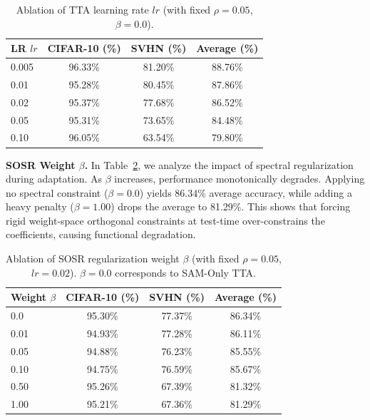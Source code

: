 \documentclass{article}
\theoremstyle{plain}
\theoremstyle{definition}
\theoremstyle{remark}
\begin{document}
\begin{table}[h]
  \caption{Ablation of TTA learning rate $lr$ (with fixed $\rho = 0.05$, $\beta = 0.0$).}
  \label{table-ablation-lr}
  \vskip 0.15in
  \begin{center}
    \begin{small}
      \setlength{\tabcolsep}{5pt}
      \begin{tabular}{lccc}
        \toprule
        LR $lr$ & CIFAR-10 (\%) & SVHN (\%) & Average (\%) \\
        \midrule
        0.005              & 96.33\% & 81.20\% & 88.76\% \\
        0.01               & 95.28\% & 80.45\% & 87.86\% \\
        0.02               & 95.37\% & 77.68\% & 86.52\% \\
        0.05               & 95.31\% & 73.65\% & 84.48\% \\
        0.10               & 96.05\% & 63.54\% & 79.80\% \\
        \bottomrule
      \end{tabular}
    \end{small}
  \end{center}
  \vskip -0.1in
\end{table}

\textbf{SOSR Weight $\beta$.} In Table~\ref{table-ablation-beta}, we analyze the impact of spectral regularization during adaptation. As $\beta$ increases, performance monotonically degrades. Applying no spectral constraint ($\beta=0.0$) yields 86.34\% average accuracy, while adding a heavy penalty ($\beta=1.00$) drops the average to 81.29\%. This shows that forcing rigid weight-space orthogonal constraints at test-time over-constrains the coefficients, causing functional degradation.

\begin{table}[h]
  \caption{Ablation of SOSR regularization weight $\beta$ (with fixed $\rho = 0.05$, $lr = 0.02$). $\beta = 0.0$ corresponds to SAM-Only TTA.}
  \label{table-ablation-beta}
  \vskip 0.15in
  \begin{center}
    \begin{small}
      \setlength{\tabcolsep}{5pt}
      \begin{tabular}{lccc}
        \toprule
        Weight $\beta$ & CIFAR-10 (\%) & SVHN (\%) & Average (\%) \\
        \midrule
        0.0                & 95.30\% & 77.37\% & 86.34\% \\
        0.01               & 94.93\% & 77.28\% & 86.11\% \\
        0.05               & 94.88\% & 76.23\% & 85.55\% \\
        0.10               & 94.75\% & 76.59\% & 85.67\% \\
        0.50               & 95.26\% & 67.39\% & 81.32\% \\
        1.00               & 95.21\% & 67.36\% & 81.29\% \\
        \bottomrule
      \end{tabular}
    \end{small}
  \end{center}
  \vskip -0.1in
\end{table}
\end{document}
